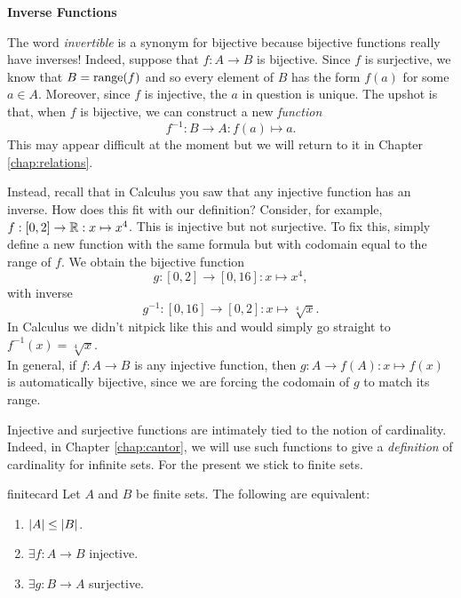 \begin{aside}{}{}
{\bf Inverse Functions}

The word \emph{invertible} is a synonym for bijective because bijective functions really have inverses! Indeed, suppose that $f:A\to B$ is bijective. Since $f$ is surjective, we know that $B=\operatorname{range}(f)$ and so every element of $B$ has the form $f(a)$ for some $a\in A$. Moreover, since $f$ is injective, the $a$ in question is unique. The upshot is that, when $f$ is bijective, we can construct a new \emph{function}
\[f^{-1}:B\to A:f(a)\mapsto a.\]
This may appear difficult at the moment but we will return to it in Chapter \ref{chap:relations}.

Instead, recall that in Calculus you saw that any injective function has an inverse. How does this fit with our definition? Consider, for example, $f:[0,2]\to\mathbb{R}:x\mapsto x^4$. This is injective but not surjective. To fix this, simply define a new function with the same formula but with codomain equal to the range of $f$. We obtain the bijective function
\[g:[0,2]\to[0,16]:x\mapsto x^4,\]
with inverse
\[g^{-1}:[0,16]\to[0,2]:x\mapsto \sqrt[4]{x}.\]
In Calculus we didn't nitpick like this and would simply go straight to $f^{-1}(x)=\sqrt[4]{x}$.\\[5pt]
In general, if $f:A\to B$ is any injective function, then $g:A\to f(A):x\mapsto f(x)$ is automatically bijective, since we are forcing the codomain of $g$ to match its range.
\end{aside}


Injective and surjective functions are intimately tied to the notion of cardinality. Indeed, in Chapter \ref{chap:cantor}, we will use such functions to give a \emph{definition} of cardinality for infinite sets. For the present we stick to finite sets. 

\begin{thm}{}{finitecard}
Let $A$ and $B$ be finite sets. The following are equivalent:
\begin{enumerate}\setlength{\itemsep}{0pt}
  \item $\left| A\right|\le\left| B\right|$.
  \item $\exists f:A\to B$ injective.
  \item $\exists g:B\to A$ surjective.
\end{enumerate}
\end{thm}


